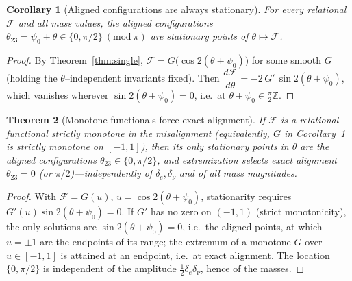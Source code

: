 \documentclass[11pt,a4paper]{article}
\newtheorem{theorem}{Theorem}
\newtheorem{corollary}[theorem]{Corollary}
\theoremstyle{definition}
\begin{document}
\begin{corollary}[Aligned configurations are always stationary]\label{cor:aligned}
For every relational $\mathcal F$ and all mass values, the aligned configurations
$\theta_{23}=\psi_0+\theta\in\{0,\pi/2\}\ (\mathrm{mod}\ \pi)$ are stationary points
of $\theta\mapsto\mathcal F$.
\end{corollary}

\begin{proof}
By Theorem~\ref{thm:single}, $\mathcal F=G\bigl(\cos 2(\theta+\psi_0)\bigr)$ for
some smooth $G$ (holding the $\theta$--independent invariants fixed). Then
$\dfrac{d\mathcal F}{d\theta}=-2\,G'\,\sin 2(\theta+\psi_0)$, which vanishes wherever
$\sin 2(\theta+\psi_0)=0$, i.e.\ at $\theta+\psi_0\in\tfrac\pi2\mathbb Z$.
\end{proof}

\begin{theorem}[Monotone functionals force exact alignment]\label{thm:monotone}
If $\mathcal F$ is a relational functional strictly monotone in the misalignment
(equivalently, $G$ in Corollary~\ref{cor:aligned} is strictly monotone on
$[-1,1]$), then its only stationary points in $\theta$ are the aligned
configurations $\theta_{23}\in\{0,\pi/2\}$, and extremization selects exact
alignment $\theta_{23}=0$ (or $\pi/2$)---independently of $\delta_e,\delta_\nu$ and
of all mass magnitudes.
\end{theorem}

\begin{proof}
With $\mathcal F=G(u)$, $u=\cos2(\theta+\psi_0)$, stationarity requires
$G'(u)\sin2(\theta+\psi_0)=0$. If $G'$ has no zero on $(-1,1)$ (strict
monotonicity), the only solutions are $\sin2(\theta+\psi_0)=0$, i.e.\ the aligned
points, at which $u=\pm1$ are the endpoints of its range; the extremum of a
monotone $G$ over $u\in[-1,1]$ is attained at an endpoint, i.e.\ at exact
alignment. The location $\{0,\pi/2\}$ is independent of the amplitude
$\tfrac12\delta_e\delta_\nu$, hence of the masses.
\end{proof}
\end{document}
